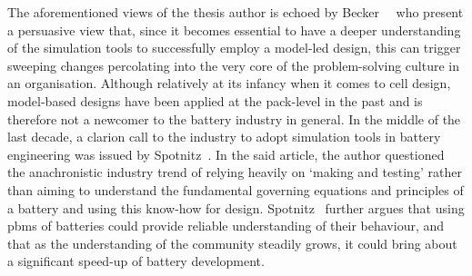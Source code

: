 The   aforementioned    views   of    the   thesis    author   is    echoed   by
Becker~\etal~\cite{Becker2005}  who  present  a   persuasive  view  that,  since
it  becomes  essential  to  have   a  deeper  understanding  of  the  simulation
tools  to successfully  employ a  model-led  design, this  can trigger  sweeping
changes percolating  into the  very core  of the  problem-solving culture  in an
organisation. Although relatively  at its infancy when it comes  to cell design,
model-based  designs have  been applied  at the  pack-level in  the past  and is
therefore not a  newcomer to the battery  industry in general. In  the middle of
the last  decade, a clarion  call to the industry  to adopt simulation  tools in
battery  engineering was  issued  by Spotnitz~\cite{Spotnitz2005}.  In the  said
article,  the author  questioned  the anachronistic  industry  trend of  relying
heavily on `making and testing' rather than aiming to understand the fundamental
governing equations  and principles  of a  battery and  using this  know-how for
design. Spotnitz~\cite{Spotnitz2005}  further argues  that using  \glspl{pbm} of
batteries could provide  reliable understanding of their behaviour,  and that as
the  understanding of  the  community steadily  grows, it  could  bring about  a
significant speed-up of battery development.



